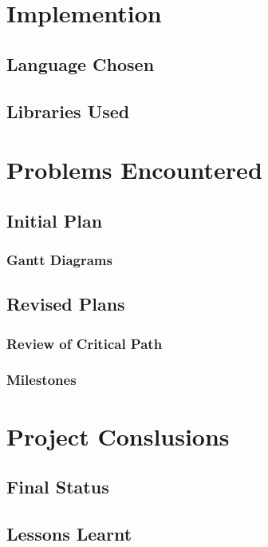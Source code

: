 \documentclass[a4paper,12pt]{report}
\begin{document}
\chapter{Implemention}

\section{Language Chosen}

\section{Libraries Used}


\chapter{Problems Encountered}

\section{Initial Plan}

\subsection{Gantt Diagrams}

\section{Revised Plans}

\subsection{Review of Critical Path}

\subsection{Milestones}


\chapter{Project Conslusions}

\section{Final Status}

\section{Lessons Learnt}
\end{document}

